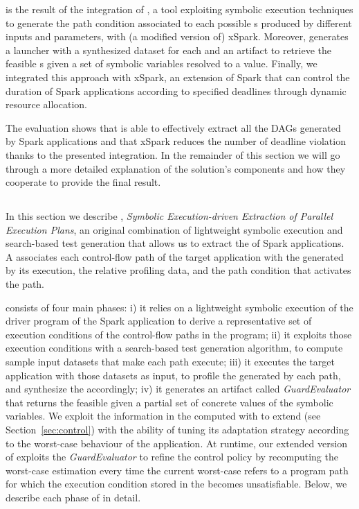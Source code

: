 \tool is the result of the integration of \dSymb, a tool exploiting symbolic execution techniques to generate the path condition associated to each possible {\plan}s produced by different inputs and parameters, with (a modified version of) xSpark.
 Moreover, \tool generates a launcher with a synthesized dataset for each \plan and an artifact to retrieve the feasible {\plan}s given a set of symbolic variables  resolved to a value. Finally, we integrated this approach with xSpark, an extension of Spark that can control the duration of Spark applications according to specified deadlines through dynamic resource allocation. 
 
The evaluation shows that \approach is able to effectively extract all the DAGs generated by Spark applications and that xSpark reduces the number of deadline violation thanks to the presented integration.
In the remainder of this section we will go through a more detailed explanation of the solution's components and how they cooperate to provide the final result.

\subsection{\approach}\label{sec:symb}

In this section we describe \approach, \emph{Symbolic Execution-driven Extraction of Parallel Execution Plans}, an original combination of lightweight symbolic execution and search-based test generation that allows us to extract the \model of Spark applications. A \model  associates each control-flow path of the target application with the \plan generated by its execution, the relative profiling data, and the path condition that activates the path. 

\approach consists of four main phases: i) it relies on a lightweight symbolic execution of the driver program of the Spark application to derive a representative set of execution conditions of the control-flow paths in the program; ii) it exploits those execution conditions with a search-based test generation algorithm, to compute sample input datasets that make each path execute; iii) it executes the target application with those datasets as input, to profile the \plan generated by each path, and synthesize the \model accordingly; iv) it generates an artifact called \textit{GuardEvaluator} that returns the feasible \plans given a partial set of concrete values of the symbolic variables.
We exploit the information in the \model computed with \approach to extend \cSpark (see Section~\ref{sec:control}) with the ability of tuning its adaptation strategy according to the worst-case behaviour of the application. At runtime, our extended version of \cSpark exploits the \textit{GuardEvaluator} to refine the control policy by recomputing the worst-case estimation every time the current worst-case refers to a program path for which the execution condition stored in the \model becomes unsatisfiable.
%
Below, we describe each phase of \approach in detail.

